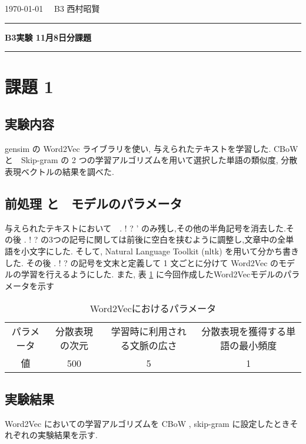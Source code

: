 \documentclass{jarticle}     %
\begin{document}
  \noindent
  \onecolumn
  \hspace{1em}
  \today
  \hfill
  \ \  B3 西村昭賢 

  \vspace{2mm}
  \hrule
  \begin{center}
  {\Large \bf B3実験 11月8日分課題}
  \end{center}
  \hrule
  \vspace{3mm}

\section{課題 1}
\subsection{実験内容}
gensim の Word2Vec ライブラリを使い, 与えられたテキストを学習した. CBoW と　Skip-gram の 2 つの学習アルゴリズムを用いて選択した単語の類似度, 分散表現ベクトルの結果を調べた.

\subsection{前処理 と　モデルのパラメータ}
与えられたテキストにおいて　.  !  ?  ' のみ残し,その他の半角記号を消去した.その後  . ! ? の3つの記号に関しては前後に空白を挟むように調整し,文章中の全単語を小文字にした.
そして, Natural Language Toolkit (nltk)\cite{NLTK} を用いて分かち書きした. その後  . ! ? の記号を文末と定義して 1 文ごとに分けて Word2Vec のモデルの学習を行えるようにした.
また, 表 \ref{Word2Vec} に今回作成したWord2Vecモデルのパラメータを示す


\begin{table}[H]
  \caption{Word2Vecにおけるパラメータ}
  \label{Word2Vec}
  \centering
  \begin{tabular}{cccc}
    \hline
    パラメータ     & 分散表現の次元  &  学習時に利用される文脈の広さ    & 分散表現を獲得する単語の最小頻度 \\
    値 &  500 & 5 & 1 \\
    \hline
  \end{tabular}
\end{table}



\subsection{実験結果 }
Word2Vec においての学習アルゴリズムを CBoW , skip-gram に設定したときそれぞれの実験結果を示す.
\end{document}
